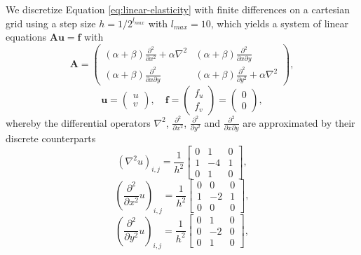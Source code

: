 We discretize Equation \eqref{eq:linear-elasticity} with finite differences on a cartesian grid using a step size $h = 1/2^{l_{max}}$ with $l_{max} = 10$, which yields a system of linear equations $\bm{A} \bm{u} = \bm{f}$ with 
\begin{equation*}
	\bm{A} =
	\begin{pmatrix}
		(\alpha + \beta) \frac{\partial^2}{\partial x^2} + \alpha \nabla^2 & (\alpha + \beta) \frac{\partial^2}{\partial x \partial y} \\
		(\alpha + \beta) \frac{\partial^2}{\partial x \partial y} & (\alpha + \beta) \frac{\partial^2}{\partial y^2} +  \alpha \nabla^2
	\end{pmatrix},
\end{equation*}
\begin{equation*}
	\bm{u} = \begin{pmatrix}
		u \\ v
	\end{pmatrix}, \quad
	\bm{f} =
	\begin{pmatrix}
		f_{u} \\ f_{v}
	\end{pmatrix} =
	\begin{pmatrix}
		0 \\ 0
	\end{pmatrix},
\end{equation*}
whereby the differential operators $\nabla^2$, $\frac{\partial^2}{\partial x^2}$, $\frac{\partial^2}{\partial y^2}$ and $\frac{\partial^2}{\partial x \partial y}$ are approximated by their discrete counterparts
\begin{equation*}
	\left(\nabla^2 u\right)_{i,j} = 
	\frac{1}{h^2} \begin{bmatrix}
		0 & 1 & 0\\
		1 & -4 & 1 \\
		0 & 1 & 0  
	\end{bmatrix},
\end{equation*}
\begin{equation*}
	\left(\frac{\partial^2}{\partial x^2} u\right)_{i,j} =
		\frac{1}{h^2} \begin{bmatrix}
		0 & 0 & 0\\
		1 & -2 & 1 \\
		0 & 0 & 0  
	\end{bmatrix},
\end{equation*}
\begin{equation*}
	\left(\frac{\partial^2}{\partial y^2} u\right)_{i,j} =
	\frac{1}{h^2} \begin{bmatrix}
		0 & 1 & 0\\
		0 & -2 & 0 \\
		0 & 1 & 0  
	\end{bmatrix},
\end{equation*}
